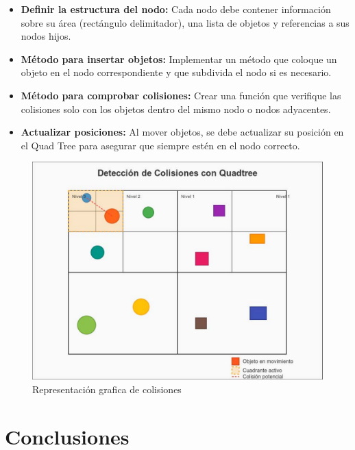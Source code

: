 \documentclass[9pt,a4paper,twoside]{rho-class/rho}
\begin{document}
        \begin{itemize}
            \item \textbf{Definir la estructura del nodo:} Cada nodo debe contener información sobre su área (rectángulo delimitador), una lista de objetos y referencias a sus nodos hijos.
            
            \item \textbf{Método para insertar objetos:} Implementar un método que coloque un objeto en el nodo correspondiente y que subdivida el nodo si es necesario.
            
            \item \textbf{Método para comprobar colisiones:} Crear una función que verifique las colisiones solo con los objetos dentro del mismo nodo o nodos adyacentes.
            
            \item \textbf{Actualizar posiciones:} Al mover objetos, se debe actualizar su posición en el Quad Tree para asegurar que siempre estén en el nodo correcto.
        \end{itemize}
        \begin{figure}[H]
            \centering
            \includegraphics[width=\linewidth]{figures/quadtree-collision.pdf}
            \caption{Representación grafica de colisiones} 
            \label{fig:colision_figure}
        \end{figure}
    
    
\section{Conclusiones}
\end{document}
